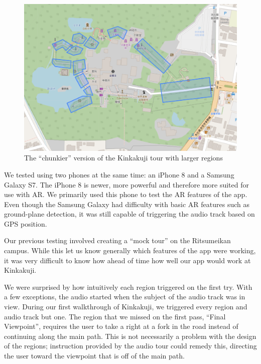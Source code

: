 \documentclass[a4paper, 10pt, american, titlepage]{article}
\begin{document}
\begin{figure}[h]
	\centering
	\includegraphics[width=\textwidth]{kinkakuji-chunkier-tour.png}
	\caption[The ``chunkier'' version of the Kinkakuji tour]{The ``chunkier'' version of
    the Kinkakuji tour with larger regions}
	\label{fig:kinkakujiChunkierTour}
\end{figure}

We tested using two phones at the same time: an iPhone 8 and a Samsung Galaxy
S7. The iPhone 8 is newer, more powerful and therefore more suited for use with
AR. We primarily used this phone to test the AR features of the app. Even
though the Samsung Galaxy had difficulty with basic AR features such as
ground-plane detection, it was still capable of triggering the audio track
based on GPS position.

Our previous testing involved creating a ``mock tour'' on the Ritsumeikan campus.
While this let us know generally which features of the app were working, it was
very difficult to know how ahead of time how well our app would work at Kinkakuji.

We were surprised by how intuitively each region triggered on the first try.
With a few exceptions, the audio started when the subject of the audio track
was in view. During our first walkthrough of Kinkakuji, we triggered every
region and audio track but one. The region that we missed on the first pass,
``Final Viewpoint'', requires the user to take a right at a fork in the road
instead of continuing along the main path. This is not necessarily a problem
with the design of the regions; instruction provided by the audio tour could
remedy this, directing the user toward the viewpoint that is off of the main
path.
\end{document}
